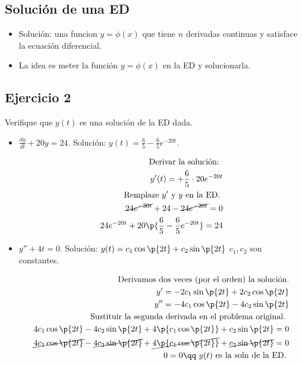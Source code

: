 \subsection{Solución de una ED}
\begin{itemize}
    \item Solución: una funcion $y=\phi(x)$ que tiene $n$ derivadas continuas y satisface la ecuación diferencial.
    \item La idea es meter la función $y=\phi(x)$ en la ED y solucionarla.
\end{itemize}

\subsection{Ejercicio 2}
Verifique que $y(t)$ es una solución de la ED dada.
\begin{itemize}
    \item $\displaystyle \frac{d y}{d t} + 20y=24$. Solución: $\displaystyle y(t)=\frac{6}{5} -\frac{6}{5}e^{-20t}$. 
        \begin{center}
           \begin{align*}
               \text{ Derivar la solución: } \\ 
               y'(t) = +\frac{6}{5}\cdot 20e^{-20t} \\ 
               \text{ Remplaze $y'$ y $y$ en la ED. } \\ 
               \cancel{24e^{-20t}}+24-\cancel{24e^{-20t}} = 0 \\ 
               24e^{-20t}+20\p{\frac{6}{5}-\frac{6}{5}e^{-20t}} = 24 \\ 
           \end{align*}
        \end{center}
    
    \item $\displaystyle y''+4t=0$. Solución: $\displaystyle y(t) = c_1\cos\p{ 2t } +c_2\sin\p{ 2t } $ $c_1,c_2$ son constantes.
        \begin{center}
           \begin{align*}
               \text{ Derivamos dos veces (por el orden) la solución.} \\ 
               y'=-2c_1\sin\p{ 2t } + 2c_2\cos\p{ 2t } \\ 
               y''=-4c_1\cos\p{ 2t } -4c_2\sin\p{ 2t } \\ 
               \text{ Sustituir la segunda derivada en el problema original. } \\ 
               4c_1\cos\p{ 2t } -4c_2\sin\p{ 2t } +4\p{c_1\cos\p{ 2t } } + c_2\sin\p{ 2t } = 0 \\ 
               \cancel{4c_1\cos\p{ 2t }} - \cancel{4c_2\sin\p{ 2t }} +\cancel{4\p{c_1\cos\p{ 2t } }} + \cancel{c_2\sin\p{ 2t }} = 0 \\ 
               0 = 0 \qq \text{ $y(t)$ es la soln de la ED. } \\ 
           \end{align*}
        \end{center}
\end{itemize}

